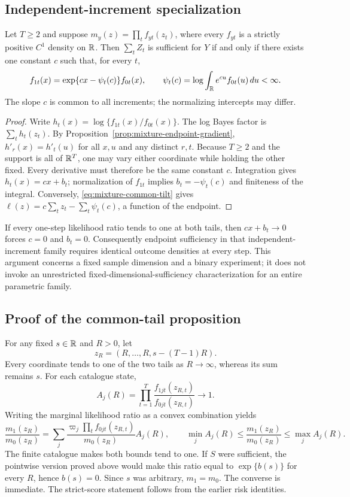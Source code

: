 \subsection{Independent-increment specialization}
\begin{proposition}
\label{prop:mixture-independent-tilt}
Let $T\geq2$ and suppose
$m_y(z)=\prod_t f_{yt}(z_t)$, where every $f_{yt}$ is a strictly positive $C^1$
density on $\mathbb R$. Then $\sum_tZ_t$ is sufficient for $Y$ if and only if there
exists one constant $c$ such that, for every $t$,
\begin{equation}
 f_{1t}(x)=\exp\{cx-\psi_t(c)\}f_{0t}(x),\qquad
 \psi_t(c)=\log\int_{\mathbb R}e^{cu}f_{0t}(u)\,du<\infty.
 \label{eq:mixture-common-tilt}
\end{equation}
The slope $c$ is common to all increments; the normalizing intercepts may
differ.
\end{proposition}
\begin{proof}
Write $h_t(x)=\log\{f_{1t}(x)/f_{0t}(x)\}$. The log Bayes factor is
$\sum_t h_t(z_t)$. By Proposition~\ref{prop:mixture-endpoint-gradient},
$h'_r(x)=h'_t(u)$ for all $x,u$ and any distinct $r,t$. Because $T\geq2$ and
the support is all of $\mathbb R^T$, one may vary either coordinate while holding the
other fixed. Every derivative must therefore be the same constant $c$.
Integration gives $h_t(x)=cx+b_t$; normalization of $f_{1t}$ implies
$b_t=-\psi_t(c)$ and finiteness of the integral. Conversely,
\eqref{eq:mixture-common-tilt} gives
$\ell(z)=c\sum_tz_t-\sum_t\psi_t(c)$, a function of the endpoint.
\end{proof}

If every one-step likelihood ratio tends to one at both tails, then
$cx+b_t\to0$ forces $c=0$ and $b_t=0$. Consequently endpoint sufficiency in
that independent-increment family requires identical outcome densities at
every step. This argument concerns a fixed sample dimension and a binary
experiment; it does not invoke an unrestricted fixed-dimensional-sufficiency
characterization for an entire parametric family.

\subsection{Proof of the common-tail proposition}
For any fixed $s\in\mathbb R$ and $R>0$, let
\[
 z_R=(R,\ldots,R,s-(T-1)R).
\]
Every coordinate tends to one of the two tails as $R\to\infty$, whereas its
sum remains $s$. For each catalogue state,
\[
 A_j(R)=\prod_{t=1}^T\frac{f_{1jt}(z_{R,t})}{f_{0jt}(z_{R,t})}\longrightarrow1.
\]
Writing the marginal likelihood ratio as a convex combination yields
\[
 \frac{m_1(z_R)}{m_0(z_R)}
 =\sum_j\frac{\varpi_j\prod_t f_{0jt}(z_{R,t})}{m_0(z_R)}A_j(R),\qquad
 \min_j A_j(R)\leq\frac{m_1(z_R)}{m_0(z_R)}\leq\max_j A_j(R).
\]
The finite catalogue makes both bounds tend to one. If $S$ were sufficient,
the pointwise version proved above would make this ratio equal to
$\exp\{b(s)\}$ for every $R$, hence $b(s)=0$. Since $s$ was arbitrary,
$m_1=m_0$. The converse is immediate. The strict-score statement follows from
the earlier risk identities.

